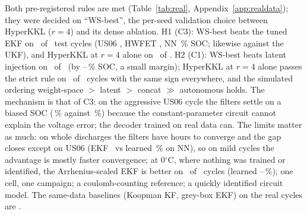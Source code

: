Both pre-registered rules are met (Table~\ref{tab:real}, Appendix~\ref{app:realdata}); they were decided on ``WS-best'', the per-seed validation choice between HyperKKL ($r=4$) and its dense ablation. H1 (C3): WS-best beats the tuned EKF on \RealHOneLearnedBetter\ of \RealNTestCycles\ test cycles (US06 \RealWsBestEkfUSZeroSixDiff, HWFET \RealWsBestEkfHWFETDiff, NN \RealWsBestEkfNNDiff\,\% SOC; likewise against the UKF), and HyperKKL at $r=4$ alone on \RealLoraEkfCyclesABetter\ of \RealNTestCycles. H2 (C1): WS-best beats latent injection on \RealHTwoWsBetter\ of \RealNTestCycles\ (by \RealWsBestLatentDiffMinAbs--\RealWsBestLatentDiffMaxAbs\,\% SOC, a small margin); HyperKKL at $r=4$ alone passes the strict rule on \RealLoraLatentCyclesABetter\ of \RealNTestCycles\ cycles with the same sign everywhere, and the simulated ordering weight-space $>$ latent $>$ concat $\gg$ autonomous holds. The mechanism is that of C3: on the aggressive US06 cycle the filters settle on a biased SOC (\RealEkfUSZeroSixRmse\,\% against \RealWsBestUSZeroSixRmse\,\%) because the constant-parameter circuit cannot explain the voltage error; the decoder trained on real data can. The limits matter as much: on whole discharges the filters have hours to converge and the gap closes except on US06 (EKF \RealWholeEkfNN\ vs learned \RealWholeWsBestNN\,\% on NN), so on mild cycles the advantage is mostly faster convergence; at 0$^\circ$C, where nothing was trained or identified, the Arrhenius-scaled EKF is better on \RealZeroEkfBetter\ of \RealZeroNCycles\ cycles (learned \RealZeroWsRmseMin--\RealZeroWsRmseMax\,\%); one cell, one campaign; a coulomb-counting reference; a quickly identified circuit model. The same-data baselines (Koopman KF, grey-box EKF) on the real cycles are \textcolor{red}{\textbf{\RealSameDataBaselines}}.

